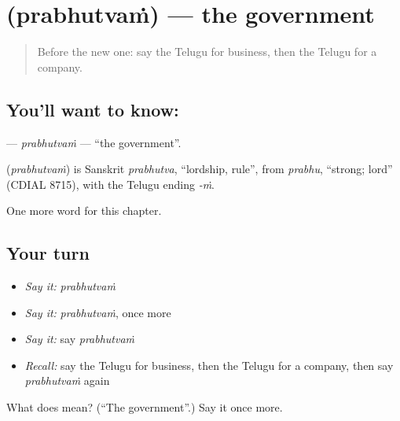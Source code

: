 \section[\texorpdfstring{\te{ప్రభుత్వం} (prabhutvaṁ)}{ప్రభుత్వం (prabhutvaṁ)}]{ (prabhutvaṁ) — the government}

\label{lesson:TE-C236-prabhutvam}



\begin{quote}
Before the new one: say the Telugu for business, then the Telugu for a company.
\end{quote}

\subsection*{You'll want to know: }
\textbf{} — \emph{prabhutvaṁ} — \textquotedblleft{}the government\textquotedblright{}.

\begin{cousinweb}
\textbf{} (\emph{prabhutvaṁ}) is Sanskrit \emph{prabhutva}, \textquotedblleft{}lordship, rule\textquotedblright{}, from \emph{prabhu}, \textquotedblleft{}strong; lord\textquotedblright{} (CDIAL 8715), with the Telugu ending \emph{-ṁ}.
\end{cousinweb}

\begin{grammarlens}[title={What you've built}]
One more word for this chapter.
\end{grammarlens}

\subsection*{Your turn}
\begin{itemize}
\raggedright
  \item \emph{Say it:} \emph{prabhutvaṁ}
  \item \emph{Say it:} \emph{prabhutvaṁ}, once more
  \item \emph{Say it:} say \emph{prabhutvaṁ}
  \item \emph{Recall:} say the Telugu for business, then the Telugu for a company, then say \emph{prabhutvaṁ} again
\end{itemize}

\begin{tcolorbox}[breakable,colback=teal!4,colframe=teal!35!black,title={Before you move on}]
What does  mean? (\textquotedblleft{}The government\textquotedblright{}.) Say it once more.
\end{tcolorbox}
